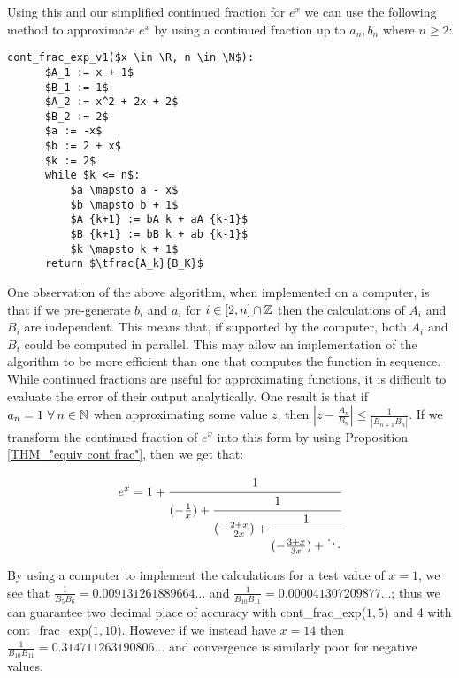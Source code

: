 Using this and our simplified continued fraction for \(e^x\) we can use the following method to approximate \(e^x\) by using a continued fraction up to \(a_n,b_n\) where \(n \ge 2\):
 
\begin{lstlisting}[caption={Continued fraction for \(e^x\) version 1},label={PCD_"cont exp v1"}]
  cont_frac_exp_v1($x \in \R, n \in \N$):
      $A_1 := x + 1$
      $B_1 := 1$
      $A_2 := x^2 + 2x + 2$
      $B_2 := 2$
      $a := -x$
      $b := 2 + x$
      $k := 2$
      while $k <= n$:
          $a \mapsto a - x$
          $b \mapsto b + 1$
          $A_{k+1} := bA_k + aA_{k-1}$
          $B_{k+1} := bB_k + ab_{k-1}$
          $k \mapsto k + 1$
      return $\tfrac{A_k}{B_K}$
\end{lstlisting}

One observation of the above algorithm, when implemented on a computer, is that if we pre-generate \(b_i\) and \(a_i\) for \(i \in [2, n]\cap \mathbb{Z}\) then the calculations of \(A_i\) and \(B_i\) are independent. This means that, if supported by the computer, both \(A_i\) and \(B_i\) could be computed in parallel. This may allow an implementation of the algorithm to be more efficient than one that computes the function in sequence.\\

While continued fractions are useful for approximating functions, it is difficult to evaluate the error of their output analytically. One result is that if \(a_n = 1\ \forall\: n \in \mathbb{N}\) when approximating some value \(z\), then \(|z - \tfrac{A_n}{B_n}| \le \frac{1}{|B_{n+1}B_n|}\)\cite{BOK_ContFrac}. If we transform the continued fraction of \(e^x\) into this form by using Proposition \ref{THM_"equiv cont frac"}, then we get that:

\begin{displaymath}
	e^x = 1 + \cfrac{1}{(-\tfrac{1}{x}) + 
			  \cfrac{1}{(-\frac{2+x}{2x}) +
			  \cfrac{1}{(-\frac{3+x}{3x}) + \ddots } } }
\end{displaymath}

By using a computer to implement the calculations for a test value of \(x = 1\), we see that \(\frac{1}{B_5B_6} = 0.009131261889664\ldots\) and \(\frac{1}{B_{10}B_{11}} = 0.000041307209877\ldots\); thus we can guarantee two decimal place of accuracy with \textrm{cont\_frac\_exp(\(1, 5\))} and 4 with \textrm{cont\_frac\_exp(\(1, 10\))}. However if we instead have \(x = 14\) then \(\frac{1}{B_{10}B_{11}} = 0.314711263190806\ldots\) and convergence is similarly poor for negative values.\\
 
